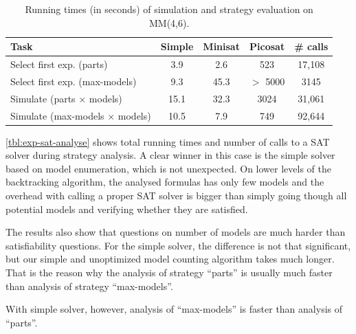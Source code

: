 \begin{table}[h]
\begin{center}
\begin{tabular}{|l|c|c|c|c|} \hline
Task & Simple & Minisat & Picosat & \# calls \\ \hline
Select first exp. (parts) & 3.9 & 2.6 & 523 & 17,108 \\
Select first exp. (max-models) & 9.3 & 45.3 & $>$ 5000 & 3145 \\
Simulate (parts $\times$ models) & 15.1 & 32.3 & 3024 & 31,061 \\
Simulate (max-models $\times$ models) & 10.5 & 7.9 & 749 & 92,644 \\\hline
\end{tabular}
\caption{Running times (in seconds) of simulation and strategy evaluation on MM(4,6).}
\label{tbl:exp-sat-sim}
\end{center}
\end{table}

\autoref{tbl:exp-sat-analyse}
  shows total running times and number of calls to
  a SAT solver during strategy analysis.
A clear winner in this case is the simple solver based on
  model enumeration,
  which is not unexpected.
On lower levels of the backtracking algorithm,
  the analysed formulas has only few models and the
  overhead with calling a proper SAT solver is bigger
  than simply going though all potential models and verifying whether
  they are satisfied.

The results also show that questions on number of models
  are much harder than satisfiability questions.
For the simple solver, the difference is not that significant,
  but our simple and unoptimized model counting algorithm
  takes much longer.
That is the reason why the analysis of strategy ``parts'' is usually much faster
  than analysis of strategy ``max-models''.

With simple solver, however, analysis of ``max-models'' is faster than
  analysis of ``parts''. 

